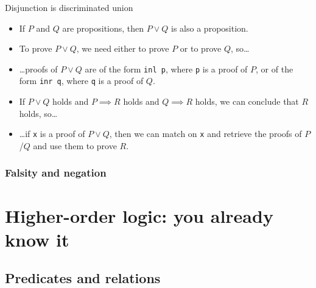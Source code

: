 \documentclass{beamer}
\newcommand{\m}[1]{\texttt{#1}}
\begin{document}
\begin{frame}{Disjunction is discriminated union}
\begin{itemize}
	\item If $P$ and $Q$ are propositions, then $P \lor Q$ is also a proposition.
	\item To prove $P \lor Q$, we need either to prove $P$ or to prove $Q$, so\dots
	\item \dots proofs of $P \lor Q$ are of the form \m{inl p}, where \m{p} is a proof of $P$, or of the form \m{inr q}, where \m{q} is a proof of $Q$.
	\item If $P \lor Q$ holds and $P \implies R$ holds and $Q \implies R$ holds, we can conclude that $R$ holds, so\dots
	\item \dots if \m{x} is a proof of $P \lor Q$, then we can match on \m{x} and retrieve the proofs of $P$/$Q$ and use them to prove $R$.
\end{itemize}
\end{frame}



\subsubsection{Falsity and negation}





\section{Higher-order logic: you already know it}

\subsection{Predicates and relations}
\end{document}
